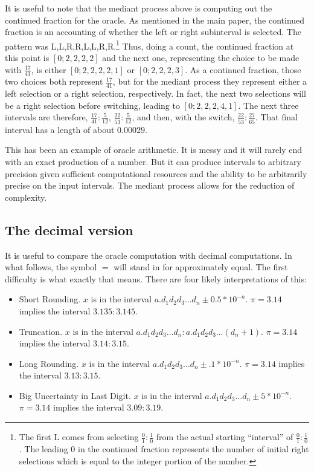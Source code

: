 \documentclass[12pt]{article}
\begin{document}
It is useful to note that the mediant process above is computing out the continued fraction for the oracle. As mentioned in the main paper, the continued fraction is an accounting of whether the left or right subinterval is selected. The pattern was L,L,R,R,L,L,R,R.\footnote{The first L comes from selecting $\frac{0}{1}: \frac{1}{0}$ from the actual starting ``interval'' of $\frac{0}{1}: \frac{1}{0}$. The leading 0 in the continued fraction represents the number of initial right selections which is equal to the integer portion of the number.} Thus, doing a count, the continued fraction at this point is $[0;2,2,2,2]$ and the next one, representing the choice to be made with $\frac{17}{41}$, is either $[0;2,2,2,2,1]$ or $[0;2,2,2,3]$. As a continued fraction, those two choices both represent $\frac{17}{41}$, but for the mediant process they represent either a left selection or a right selection, respectively. In fact, the next two selections will be a right selection before switching, leading to $[0;2,2,2,4,1]$. The next three intervals are therefore, $\frac{17}{41}: \frac{5}{12}$, $\frac{22}{53}: \frac{5}{12}$, and then, with the switch, $\frac{22}{53}: \frac{27}{65}$. That final interval has a length of about $0.00029$. 

This has been an example of oracle arithmetic. It is messy and it will rarely end with an exact production of a number. But it can produce intervals to arbitrary precision given sufficient computational resources and the ability to be arbitrarily precise on the input intervals. The mediant process allows for the reduction of complexity. 

\subsection{The decimal version}

It is useful to compare the oracle computation with decimal computations. In what follows, the symbol $=$ will stand in for approximately equal. The first difficulty is what exactly that means. There are four likely interpretations of this:

\begin{itemize}
\item Short Rounding. $x$ is in the interval $a.d_1d_2d_3\ldots d_n \pm 0.5*10^{-n}$. $\pi = 3.14$ implies the interval $3.135:3.145$.
\item Truncation. $x$ is in the interval $a.d_1d_2d_3\ldots d_n: a.d_1d_2d_3\ldots (d_n+1)$. $\pi=3.14$ implies the interval $3.14:3.15$.
\item Long Rounding. $x$ is in the interval $a.d_1d_2d_3\ldots d_n \pm .1*10^{-n}$. $\pi = 3.14$ implies the interval $3.13:3.15$. 
\item Big Uncertainty in Last Digit. $x$ is in the interval $a.d_1d_2d_3\ldots d_n \pm 5*10^{-n}$. $\pi = 3.14$ implies the interval $3.09:3.19$. 
\end{itemize}
\end{document}
